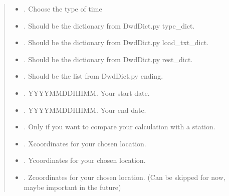 \documentclass[letterpaper,10pt,english]{sphinxmanual}
\begin{document}
\begin{fulllineitems}
\begin{fulllineitems}
\begin{quote}
\begin{description}
\begin{itemize}
\item {} 
\sphinxAtStartPar
{} \textendash{} . Choose the type of time

\item {} 
\sphinxAtStartPar
{} \textendash{} . Should be the dictionary from DwdDict.py type\_dict.

\item {} 
\sphinxAtStartPar
{} \textendash{} . Should be the dictionary from DwdDict.py load\_txt\_dict.

\item {} 
\sphinxAtStartPar
{} \textendash{} . Should be the dictionary from DwdDict.py rest\_dict.

\item {} 
\sphinxAtStartPar
{} \textendash{} . Should be the list from DwdDict.py ending.

\item {} 
\sphinxAtStartPar
{} \textendash{} . YYYYMMDDHHMM. Your start date.

\item {} 
\sphinxAtStartPar
{} \textendash{} . YYYYMMDDHHMM. Your end date.

\item {} 
\sphinxAtStartPar
{} \textendash{} . Only if you want to compare your calculation with a station.

\item {} 
\sphinxAtStartPar
{} \textendash{} . X\sphinxhyphen{}coordinates for your chosen location.

\item {} 
\sphinxAtStartPar
{} \textendash{} . Y\sphinxhyphen{}coordinates for your chosen location.

\item {} 
\sphinxAtStartPar
{} \textendash{} . Z\sphinxhyphen{}coordinates for your chosen location. (Can be skipped for now, maybe important in the future)


\end{itemize}
\end{description}
\end{quote}
\end{fulllineitems}
\end{fulllineitems}
\end{document}
